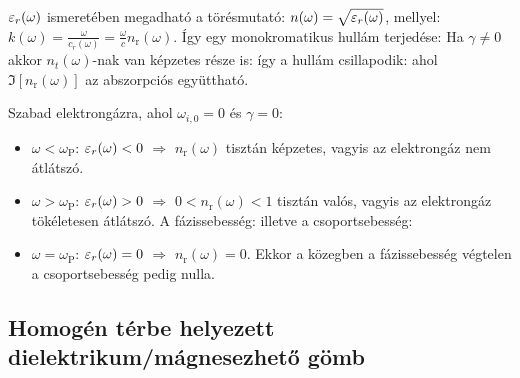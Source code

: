    $\varepsilon_r(\omega)$ ismeretében megadható a törésmutató: $n(\omega)=\sqrt{\varepsilon_r(\omega)}$, mellyel: $k(\omega)=\frac{\omega}{c_r(\omega)}=\frac{\omega}{c}n_\text{r}(\omega)$. Így egy monokromatikus hullám terjedése:
   Ha $\gamma\neq 0$ akkor $n_t(\omega)$-nak van képzetes része is: 
   így a hullám csillapodik:
   ahol $\Im[n_\text{r}(\omega)]$ az abszorpciós együttható. 
   
   Szabad elektrongázra, ahol $\omega_{i,0}=0$ és $\gamma=0$:
   \begin{itemize}
    \item $\omega<\omega_\text{P}$: $\varepsilon_r(\omega)<0$ $\Rightarrow$ $n_\text{r}(\omega)$ tisztán képzetes, vagyis az elektrongáz nem átlátszó.
    \item $\omega>\omega_\text{P}$: $\varepsilon_r(\omega)>0$ $\Rightarrow$ $0<n_\text{r}(\omega)<1$ tisztán valós, vagyis az elektrongáz tökéletesen átlátszó. A fázissebesség:
     illetve a csoportsebesség:
    \item $\omega=\omega_\text{P}$: $\varepsilon_r(\omega)=0$ $\Rightarrow$ $n_\text{r}(\omega)=0$. Ekkor a közegben a fázissebesség végtelen a csoportsebesség pedig nulla. 
   \end{itemize}
   
  \subsection{Homogén térbe helyezett dielektrikum/mágnesezhető gömb}
   
